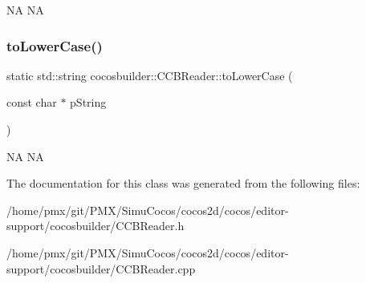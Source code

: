 NA  NA \mbox{\label{classcocosbuilder_1_1CCBReader_a00b8f2a4ea66108ac0d78e6861014d3f}} 
\subsubsection{\texorpdfstring{to\+Lower\+Case()}{toLowerCase()}\hspace{0.1cm}{\footnotesize\ttfamily [2/2]}}
{\footnotesize\ttfamily static std\+::string cocosbuilder\+::\+C\+C\+B\+Reader\+::to\+Lower\+Case (\begin{DoxyParamCaption}\item[{const char $\ast$}]{p\+String }\end{DoxyParamCaption})\hspace{0.3cm}{\ttfamily [static]}}

NA  NA 

The documentation for this class was generated from the following files\+:\begin{DoxyCompactItemize}
\item 
/home/pmx/git/\+P\+M\+X/\+Simu\+Cocos/cocos2d/cocos/editor-\/support/cocosbuilder/C\+C\+B\+Reader.\+h\item 
/home/pmx/git/\+P\+M\+X/\+Simu\+Cocos/cocos2d/cocos/editor-\/support/cocosbuilder/C\+C\+B\+Reader.\+cpp\end{DoxyCompactItemize}
